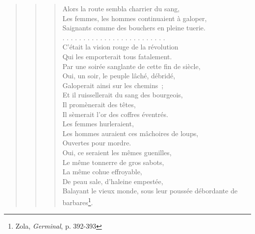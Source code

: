 \documentclass[french,twoside]{book} %
\begin{document}
\begin{verse}
\begin{verse}
\begin{verse}
Alors la route sembla charrier du sang,\\
Les femmes, les hommes continuaient à galoper,\\
Saignants comme des bouchers en pleine tuerie.\\
. . . . . . . . . . . . . . . . . . . . . . . . .\\
C’était la vision rouge de la révolution\\
Qui les emporterait tous fatalement.\\
Par une soirée sanglante de cette fin de siècle,\\
Oui, un soir, le peuple lâché, débridé,\\
Galoperait ainsi sur les chemins ;\\
Et il ruissellerait du sang des bourgeois,\\
Il promènerait des têtes,\\
Il sèmerait l’or des coffres éventrés.\\
Les femmes hurleraient,\\
Les hommes auraient ces mâchoires de loups,\\
Ouvertes pour mordre.\\
Oui, ce seraient les mêmes guenilles,\\
Le même tonnerre de gros sabots,\\
La même cohue effroyable,\\
De peau sale, d’haleine empestée,\\
Balayant le vieux monde, sous leur poussée débordante de barbares\footnote{ Zola, \emph{Germinal}, p. 392-393}.\\
\end{verse}


\end{verse}
\end{verse}
\end{document}
